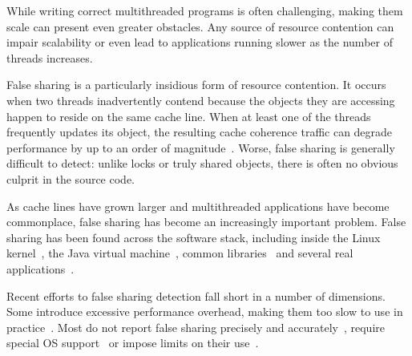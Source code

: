 
\label{sec:intro} 

While writing correct multithreaded programs is often challenging,
making them scale can present even greater obstacles. Any source of
resource contention can impair scalability or even lead to
applications running slower as the number of threads increases.

False sharing is a particularly insidious form of resource contention.
It occurs when two threads inadvertently contend because the objects
they are accessing happen to reside on the same cache line. When at least
one of the threads frequently updates its object, the resulting cache
coherence traffic can degrade performance by up to an order of
magnitude~\cite{falseshareeffect}. Worse, false sharing is generally
difficult to detect: unlike locks or truly shared objects, there is
often no obvious culprit in the source code.

As cache lines have grown larger and multithreaded applications have
become commonplace, false sharing has become an increasingly important
problem. False sharing has been found across the software stack,
including inside the Linux kernel~\cite{OSfalsesharing}, the Java
virtual machine~\cite{JVMfalsesharing}, common
libraries~\cite{libfalsesharing} and several real
applications~\cite{mysql,appfalsesharing}.

Recent efforts to false sharing detection fall short in a number of
dimensions. Some introduce excessive performance overhead, making them
too slow to use in practice~\cite{falseshare:binaryinstrumentation1,falseshare:binaryinstrumentation2,falseshare:simulator}. Most
do not report false sharing precisely and
accurately~\cite{falseshare:binaryinstrumentation1,detect:ptu,detect:intel,falseshare:binaryinstrumentation2,DProf,qinzhaodetection}, require special OS
support~\cite{OSdetection} or impose limits on their use~\cite{sheriff}.

